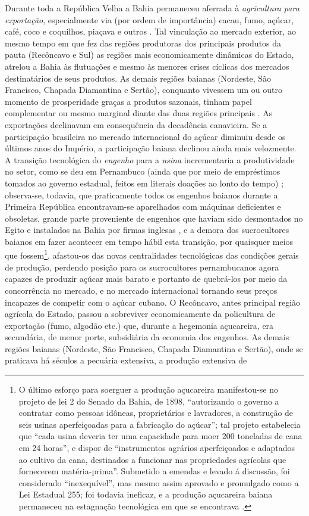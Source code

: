 Durante toda a República Velha a Bahia permaneceu aferrada à \textit{agricultura para exportação}, especialmente via (por ordem de importância) cacau, fumo, açúcar, café, coco e coquilhos, piaçava e outros \cite[p.~77;110]{CPE1980}. Tal vinculação ao mercado exterior, ao mesmo tempo em que fez das regiões produtoras dos principais produtos da pauta (Recôncavo e Sul) as regiões mais economicamente dinâmicas do Estado, atrelou a Bahia às flutuações e mesmo às menores crises cíclicas dos mercados destinatários de seus produtos. As demais regiões baianas (Nordeste, São Francisco, Chapada Diamantina e Sertão), conquanto vivessem um ou outro momento de prosperidade graças a produtos sazonais, tinham papel complementar ou mesmo marginal diante das duas regiões principais \cite[p.~77]{CPE1980}. As exportações declinavam em consequência da decadência canavieira. Se a participação brasileira no mercado internacional do açúcar diminuiu desde os últimos anos do Império, a participação baiana declinou ainda mais velozmente. A transição tecnológica do \textit{engenho} para a \textit{usina} incrementaria a produtividade no setor, como se deu em Pernambuco (ainda que por meio de empréstimos tomados ao governo estadual, feitos em literais doações ao lonto do tempo) \cite[p.~31]{gorender_burguesia_1990}; observa-se, todavia, que praticamente todos os engenhos baianos durante a Primeira República encontravam-se aparelhados com máquinas deficientes e obsoletas, grande parte proveniente de engenhos que haviam sido desmontados no Egito e instalados na Bahia por firmas inglesas \cite[p.~74]{sampaio_legislativo_1985}, e a demora dos sucrocultores baianos em fazer acontecer em tempo hábil esta transição, por quaisquer meios que fossem\footnote{O último esforço para soerguer a produção açucareira manifestou-se no projeto de lei 2 do Senado da Bahia, de 1898, ``autorizando o governo a contratar como pessoas idôneas, proprietários e lavradores, a construção de seis usinas aperfeiçoadas para a fabricação do açúcar''; tal projeto estabelecia que ``cada usina deveria ter uma capacidade para moer 200 toneladas de cana em 24 horas'', e dispor de ``instrumentos agrários aperfeiçoados e adaptados ao cultivo da cana, destinados a funcionar nas propriedades agrícolas que fornecerem matéria-prima''. Submetido a emendas e levado á discussão, foi considerado ``inexequível'', mas mesmo assim aprovado e promulgado como a Lei Estadual 255; foi todavia ineficaz, e a produção açucareira baiana permaneceu na estagnação tecnológica em que se encontrava \cite[pp.~74-75]{sampaio_legislativo_1985}.}, afastou-os das novas centralidades tecnológicas das condições gerais de produção, perdendo posição para os sucrocultores pernambucanos agora capazes de produzir açúcar mais barato e portanto de quebrá-los por meio da concorrência no mercado, e no mercado internacional tornando seus preços incapazes de competir com o açúcar cubano. O Recôncavo, antes principal região agrícola do Estado, passou a sobreviver economicamente da policultura de exportação (fumo, algodão etc.) que, durante a hegemonia açucareira, era secundária, de menor porte, subsidiária da economia dos engenhos. As demais regiões baianas (Nordeste, São Francisco, Chapada Diamantina e Sertão), onde se praticava há séculos a pecuária extensiva, a produção extensiva de 